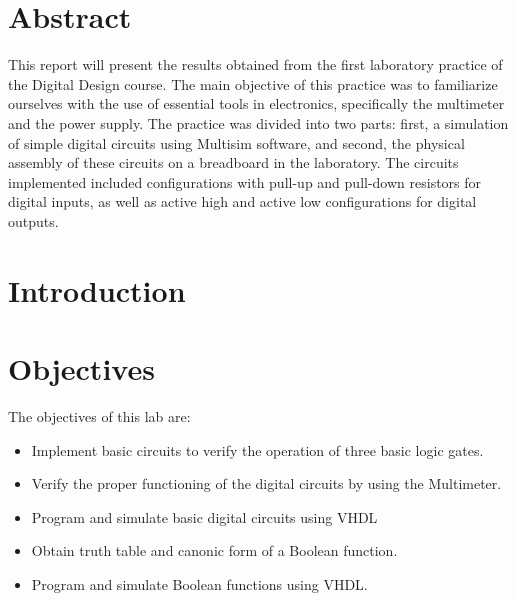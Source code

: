 \documentclass[12pt]{article}  %
\begin{document}
\section{Abstract} %
This report will present the results obtained from the first laboratory practice of the Digital Design course. The main objective of this practice was to familiarize ourselves with the use of essential tools in electronics, specifically the multimeter and the power supply. The practice was divided into two parts: first, a simulation of simple digital circuits using Multisim software, and second, the physical assembly of these circuits on a breadboard in the laboratory. The circuits implemented included configurations with pull-up and pull-down resistors for digital inputs, as well as active high and active low configurations for digital outputs. 
\section{Introduction} %

\section{Objectives} %
The objectives of this lab are:
\begin{itemize}
  \item Implement basic circuits to verify the operation of three basic logic gates.
  \item Verify the proper functioning of the digital circuits by using the Multimeter.
  \item Program and simulate basic digital circuits using VHDL
  \item Obtain truth table and canonic form of a Boolean function.
  \item Program and simulate Boolean functions using VHDL.
\end{itemize}
\end{document}
